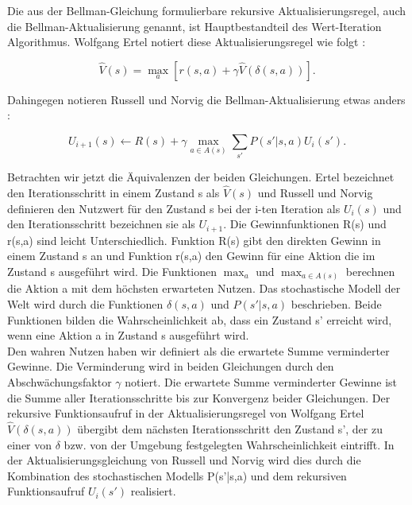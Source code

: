 Die aus der Bellman-Gleichung formulierbare rekursive Aktualisierungsregel, auch die Bellman-Aktualisierung genannt, ist Hauptbestandteil des Wert-Iteration Algorithmus. Wolfgang Ertel notiert diese Aktualisierungsregel wie folgt \cite[294]{Ertel}:

\begin{equation}
\hat{V}(s) = \max_a [r(s,a) + \gamma \hat{V}(\delta(s,a))].
\end{equation}

Dahingegen notieren Russell und Norvig die Bellman-Aktualisierung etwas anders \cite[760]{Russell}:

\begin{equation}
U_{i+1}(s) \leftarrow R(s) + \gamma \max_{a \in A(s)} \sum_{s'} P(s'|s,a)U_i(s').
\end{equation} 

Betrachten wir jetzt die Äquivalenzen der beiden Gleichungen. Ertel bezeichnet den Iterationsschritt in einem Zustand s als $\hat{V}(s)$ und Russell und Norvig definieren den Nutzwert für den Zustand s bei der i-ten Iteration als $U_{i}(s)$ und den Iterationsschritt bezeichnen sie als $U_{i+1}$. Die Gewinnfunktionen R(s) und r(s,a) sind leicht Unterschiedlich. Funktion R(s) gibt den direkten Gewinn in einem Zustand s an und Funktion r(s,a) den Gewinn für eine Aktion die im Zustand s ausgeführt wird. Die Funktionen $\max_a$ und $\max_{a \in A(s)}$ berechnen die Aktion a mit dem höchsten erwarteten Nutzen. Das stochastische Modell der Welt wird durch die Funktionen $\delta(s,a)$ und $P(s'|s,a)$ beschrieben. Beide Funktionen bilden die Wahrscheinlichkeit ab, dass ein Zustand s' erreicht wird, wenn eine Aktion a in Zustand s ausgeführt wird. \\

Den wahren Nutzen haben wir definiert als die erwartete Summe verminderter Gewinne. Die Verminderung wird in beiden Gleichungen durch den Abschwächungsfaktor $\gamma$ notiert. Die erwartete Summe verminderter Gewinne ist die Summe aller Iterationsschritte bis zur Konvergenz beider Gleichungen. Der rekursive Funktionsaufruf in der Aktualisierungsregel von Wolfgang Ertel $\hat{V}(\delta(s,a))$ übergibt dem nächsten Iterationsschritt den Zustand s', der zu einer von $\delta$ bzw. von der Umgebung festgelegten Wahrscheinlichkeit eintrifft. In der Aktualisierungsgleichung von Russell und Norvig wird dies durch die Kombination des stochastischen Modells P(s'|s,a) und dem rekursiven Funktionsaufruf $U_i(s')$ realisiert.\\ 

